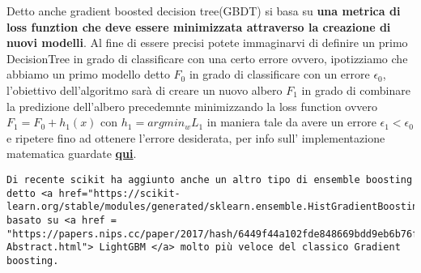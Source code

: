 \documentclass[11pt]{article}
\begin{document}
Detto anche gradient boosted decision tree(GBDT) si basa su \textbf{una
metrica di loss funztion che deve essere minimizzata attraverso la
creazione di nuovi modelli}. Al fine di essere precisi potete
immaginarvi di definire un primo DecisionTree in grado di classificare
con una certo errore ovvero, ipotizziamo che abbiamo un primo modello
detto \(F_0\) in grado di classificare con un errore \(\epsilon_0\),
l'obiettivo dell'algoritmo sarà di creare un nuovo albero \(F_1\) in
grado di combinare la predizione dell'albero precedemnte minimizzando la
loss function ovvero \(F_1 = F_0 + h_1(x)\) con \(h_1 = argmin_{w} L_1\)
in maniera tale da avere un errore \(\epsilon_1 < \epsilon_0\) e
ripetere fino ad ottenere l'errore desiderata, per info sull'
implementazione matematica guardate
\textbf{\href{https://scikit-learn.org/stable/modules/ensemble.html\#mathematical-formulation}{qui}}.

\begin{verbatim}
Di recente scikit ha aggiunto anche un altro tipo di ensemble boosting detto <a href="https://scikit-learn.org/stable/modules/generated/sklearn.ensemble.HistGradientBoostingClassifier.html#sklearn.ensemble.HistGradientBoostingClassifier">histgradientboosting</a> basato su <a href = "https://papers.nips.cc/paper/2017/hash/6449f44a102fde848669bdd9eb6b76fa-Abstract.html"> LightGBM </a> molto più veloce del classico Gradient boosting.
\end{verbatim}
\end{document}
